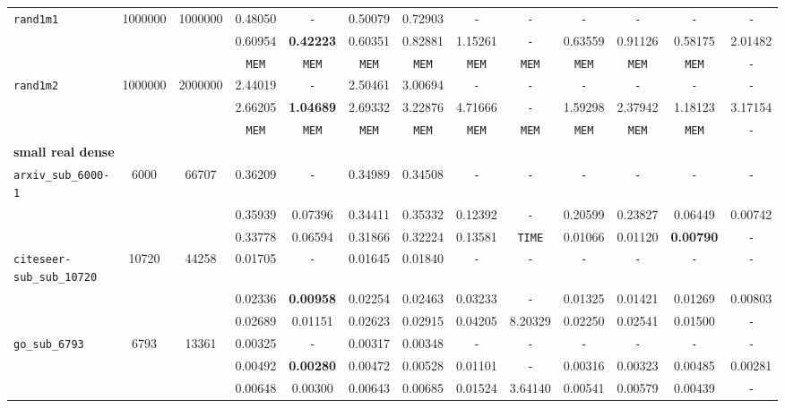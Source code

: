 \begin{table}
{\begin{tabular}{ l c c | c c c c c c c c c c }
\hline
\verb|rand1m1| & 1000000 & 1000000 & 0.48050 & \verb|-| & 0.50079 & 0.72903 & \verb|-| & \verb|-| & \verb|-| & \verb|-| & \verb|-| & \verb|-| \\
 &  &  & 0.60954 & \textbf{0.42223} & 0.60351 & 0.82881 & 1.15261 & \verb|-| & 0.63559 & 0.91126 & 0.58175 & 2.01482 \\
 &  &  & \verb|MEM| & \verb|MEM| & \verb|MEM| & \verb|MEM| & \verb|MEM| & \verb|MEM| & \verb|MEM| & \verb|MEM| & \verb|MEM| & \verb|-| \\
\hline
\verb|rand1m2| & 1000000 & 2000000 & 2.44019 & \verb|-| & 2.50461 & 3.00694 & \verb|-| & \verb|-| & \verb|-| & \verb|-| & \verb|-| & \verb|-| \\
 &  &  & 2.66205 & \textbf{1.04689} & 2.69332 & 3.22876 & 4.71666 & \verb|-| & 1.59298 & 2.37942 & 1.18123 & 3.17154 \\
 &  &  & \verb|MEM| & \verb|MEM| & \verb|MEM| & \verb|MEM| & \verb|MEM| & \verb|MEM| & \verb|MEM| & \verb|MEM| & \verb|MEM| & \verb|-| \\
\hline
\multicolumn{13}{l}{\textbf{small real dense}} \\
\hline
\verb|arxiv_sub_6000-1| & 6000 & 66707 & 0.36209 & \verb|-| & 0.34989 & 0.34508 & \verb|-| & \verb|-| & \verb|-| & \verb|-| & \verb|-| & \verb|-| \\
 &  &  & 0.35939 & 0.07396 & 0.34411 & 0.35332 & 0.12392 & \verb|-| & 0.20599 & 0.23827 & 0.06449 & 0.00742 \\
 &  &  & 0.33778 & 0.06594 & 0.31866 & 0.32224 & 0.13581 & \verb|TIME| & 0.01066 & 0.01120 & \textbf{0.00790} & \verb|-| \\
\hline
\verb|citeseer-sub_sub_10720| & 10720 & 44258 & 0.01705 & \verb|-| & 0.01645 & 0.01840 & \verb|-| & \verb|-| & \verb|-| & \verb|-| & \verb|-| & \verb|-| \\
 &  &  & 0.02336 & \textbf{0.00958} & 0.02254 & 0.02463 & 0.03233 & \verb|-| & 0.01325 & 0.01421 & 0.01269 & 0.00803 \\
 &  &  & 0.02689 & 0.01151 & 0.02623 & 0.02915 & 0.04205 & 8.20329 & 0.02250 & 0.02541 & 0.01500 & \verb|-| \\
\hline
\verb|go_sub_6793| & 6793 & 13361 & 0.00325 & \verb|-| & 0.00317 & 0.00348 & \verb|-| & \verb|-| & \verb|-| & \verb|-| & \verb|-| & \verb|-| \\
 &  &  & 0.00492 & \textbf{0.00280} & 0.00472 & 0.00528 & 0.01101 & \verb|-| & 0.00316 & 0.00323 & 0.00485 & 0.00281 \\
 &  &  & 0.00648 & 0.00300 & 0.00643 & 0.00685 & 0.01524 & 3.64140 & 0.00541 & 0.00579 & 0.00439 & \verb|-| \\

\end{tabular}}
\end{table}
